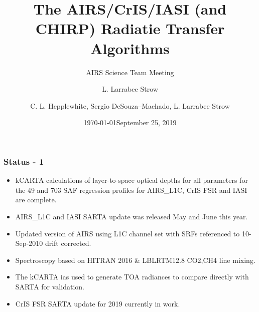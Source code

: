 \documentclass[10pt,t]{beamer}
\author{L. Larrabee Strow}
\date{\today}
\title{\large The AIRS/CrIS/IASI (and CHIRP) \newline
 Radiatie Transfer Algorithms }
\subtitle{\footnotesize{AIRS Science Team Meeting}}
\date{\vspace{0.1in}\footnotesize{September 25, 2019 \vfill}}
\author{C. L. Hepplewhite\inst{1,2}, Sergio DeSouza--Machado\inst{1,2}, L. Larrabee Strow\inst{1,2}}
\institute[UMBC]{\inst{1} UMBC Physics Dept. \and \inst{2}UMBC JCET}
\begin{document}
\maketitle
{}

    

\begin{frame}
  \frametitle{Status - 1}
  \begin{itemize}
  \item kCARTA calculations of layer-to-space optical depths for all parameters for the 49 and 703 SAF regression profiles for AIRS\_L1C, CrIS FSR and IASI are complete. 
  \item AIRS\_L1C and IASI SARTA update was released May and June this year.
  \item Updated version of AIRS using L1C channel set with SRFs referenced to 10-Sep-2010 drift corrected. 
  \item Spectroscopy based on HITRAN 2016 \& LBLRTM12.8 CO2,CH4 line mixing.
  \item The kCARTA ias used to generate TOA radiances to compare directly with SARTA for validation.
  \item CrIS FSR SARTA update for 2019 currently in work.
  
  \end{itemize}
\end{frame}
\end{document}

